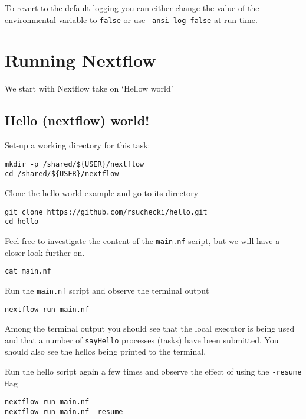 To revert to the default logging you can either change the value of the environmental variable to \texttt{false} or use \texttt{-ansi-log false} at run time.


\newpage


\section{Running Nextflow}

We start with Nextflow take on `Hellow world'%

\subsection{Hello (nextflow) world!}




Set-up a working directory for this task:


\begin{steps}
\begin{lstlisting}
mkdir -p /shared/${USER}/nextflow
cd /shared/${USER}/nextflow
\end{lstlisting}
\end{steps}

Clone the hello-world example and go to its directory

\begin{steps}
\begin{lstlisting}
git clone https://github.com/rsuchecki/hello.git
cd hello
\end{lstlisting}

Feel free to investigate the content of the \texttt{main.nf} script, but we will have a closer look further on.

\begin{lstlisting}
cat main.nf
\end{lstlisting}

Run the \texttt{main.nf} script and observe the terminal output

\begin{lstlisting}
nextflow run main.nf 
\end{lstlisting}

Among the terminal output you should see that the local executor is being used and that a number of \texttt{sayHello} processes (tasks) have been submitted. You should also see the hellos being printed to the terminal.

Run the hello script again a few times and observe the effect of using the \texttt{-resume} flag

\begin{lstlisting}
nextflow run main.nf 
nextflow run main.nf -resume
\end{lstlisting}
\end{steps}


